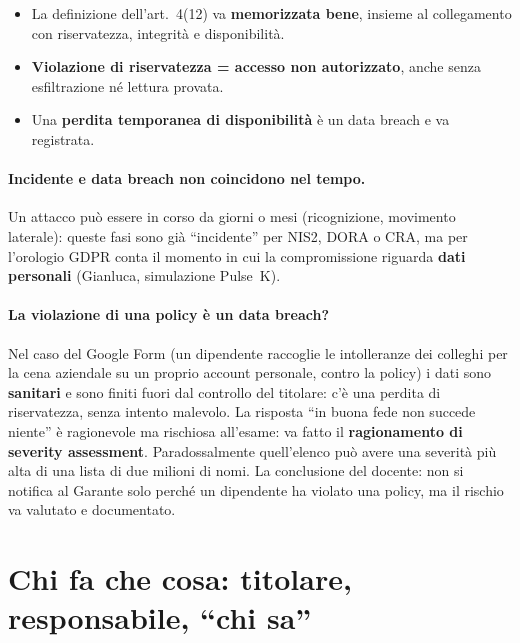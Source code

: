 \begin{esame}
\begin{itemize}
  \item La definizione dell'art.~4(12) va \textbf{memorizzata bene}, insieme al collegamento con
    riservatezza, integrità e disponibilità.
  \item \textbf{Violazione di riservatezza = accesso non autorizzato}, anche senza esfiltrazione né
    lettura provata.
  \item Una \textbf{perdita temporanea di disponibilità} è un data breach e va registrata.
\end{itemize}
\end{esame}

\paragraph{Incidente e data breach non coincidono nel tempo.} Un attacco può essere in corso da giorni
o mesi (ricognizione, movimento laterale): queste fasi sono già ``incidente'' per NIS2, DORA o CRA, ma
per l'orologio GDPR conta il momento in cui la compromissione riguarda \textbf{dati personali}
(Gianluca, simulazione Pulse~K).

\paragraph{La violazione di una policy è un data breach?} Nel caso del Google Form (un dipendente
raccoglie le intolleranze dei colleghi per la cena aziendale su un proprio account personale, contro la
policy) i dati sono \textbf{sanitari} e sono finiti fuori dal controllo del titolare: c'è una perdita di
riservatezza, senza intento malevolo. La risposta ``in buona fede non succede niente'' è ragionevole ma
rischiosa all'esame: va fatto il \textbf{ragionamento di severity assessment}. Paradossalmente quell'elenco
può avere una severità più alta di una lista di due milioni di nomi. La conclusione del docente: non si
notifica al Garante solo perché un dipendente ha violato una policy, ma il rischio va valutato e
documentato.

\section{Chi fa che cosa: titolare, responsabile, ``chi sa''}
\label{sec:breach-ruoli}

